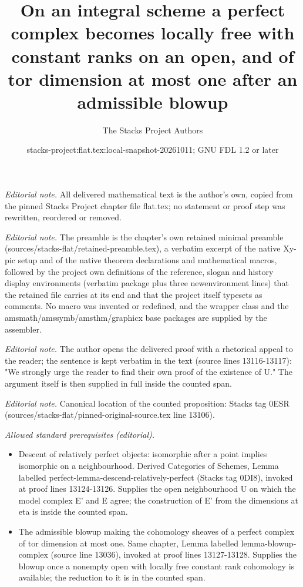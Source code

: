 \documentclass[10pt,a4paper]{amsart}
\title{On an integral scheme a perfect complex becomes locally free with constant ranks on an open, and of tor dimension at most one after an admissible blowup}
\author{The Stacks Project Authors}
\date{stacks-project:flat.tex:local-snapshot-20261011; GNU FDL 1.2 or later}
\theoremstyle{plain}
\theoremstyle{definition}
\theoremstyle{remark}
\numberwithin{equation}{subsection}
\begin{document}
\maketitle
\noindent\textit{Editorial note.} All delivered mathematical text is the author's own, copied from the pinned Stacks Project chapter file flat.tex; no statement or proof step was rewritten, reordered or removed.\par\medskip
\noindent\textit{Editorial note.} The preamble is the chapter's own retained minimal preamble (sources/stacks-flat/retained-preamble.tex), a verbatim excerpt of the native Xy-pic setup and of the native theorem declarations and mathematical macros, followed by the project own definitions of the reference, slogan and history display environments (verbatim package plus three newenvironment lines) that the retained file carries at its end and that the project itself typesets as comments. No macro was invented or redefined, and the wrapper class and the amsmath/amssymb/amsthm/graphicx base packages are supplied by the assembler.\par\medskip
\noindent\textit{Editorial note.} The author opens the delivered proof with a rhetorical appeal to the reader; the sentence is kept verbatim in the text (source lines 13116-13117): "We strongly urge the reader to find their own proof of the existence of U." The argument itself is then supplied in full inside the counted span.\par\medskip
\noindent\textit{Editorial note.} Canonical location of the counted proposition: Stacks tag 0ESR (sources/stacks-flat/pinned-original-source.tex line 13106).\par\medskip
\noindent\textit{Allowed standard prerequisites (editorial).}\begin{itemize}
\item Descent of relatively perfect objects: isomorphic after a point implies isomorphic on a neighbourhood. Derived Categories of Schemes, Lemma labelled perfect-lemma-descend-relatively-perfect (Stacks tag 0DI8), invoked at proof lines 13124-13126. Supplies the open neighbourhood U on which the model complex E' and E agree; the construction of E' from the dimensions at eta is inside the counted span.
\item The admissible blowup making the cohomology sheaves of a perfect complex of tor dimension at most one. Same chapter, Lemma labelled lemma-blowup-complex (source line 13036), invoked at proof lines 13127-13128. Supplies the blowup once a nonempty open with locally free constant rank cohomology is available; the reduction to it is in the counted span.
\end{itemize}\medskip
\end{document}
